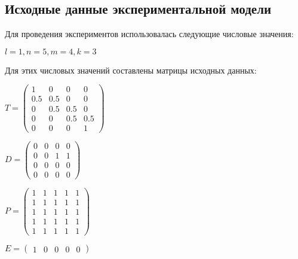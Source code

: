 \subsection*{Исходные данные экспериментальной модели}
Для проведения экспериментов использовалась следующие числовые значения:
\begin{center}
  $l = 1, n = 5, m = 4, k = 3$
\end{center}

Для этих числовых значений составлены матрицы исходных данных:
\begin{center}
  $
  T = 
  \begin{pmatrix}
      1 &   0 &   0 & 0   \\
    0.5 & 0.5 &   0 & 0   \\
      0 & 0.5 & 0.5 & 0   \\
      0 &   0 & 0.5 & 0.5 \\
      0 &   0 &   0 & 1 
  \end{pmatrix}
  $
\end{center}

\begin{center}
  $
  D = 
  \begin{pmatrix}
    0 & 0 & 0 & 0   \\
    0 & 0 & 1 & 1   \\
    0 & 0 & 0 & 0   \\
    0 & 0 & 0 & 0 
  \end{pmatrix}
  $
\end{center}

\begin{center}
  $
  P = 
  \begin{pmatrix}
    1 & 1 & 1 & 1 & 1   \\
    1 & 1 & 1 & 1 & 1   \\
    1 & 1 & 1 & 1 & 1   \\
    1 & 1 & 1 & 1 & 1   \\
    1 & 1 & 1 & 1 & 1 
  \end{pmatrix}
  $
\end{center}

\begin{center}
  $
  E = \begin{pmatrix}
    1 & 0 & 0 & 0 & 0
  \end{pmatrix}
  $
\end{center}


